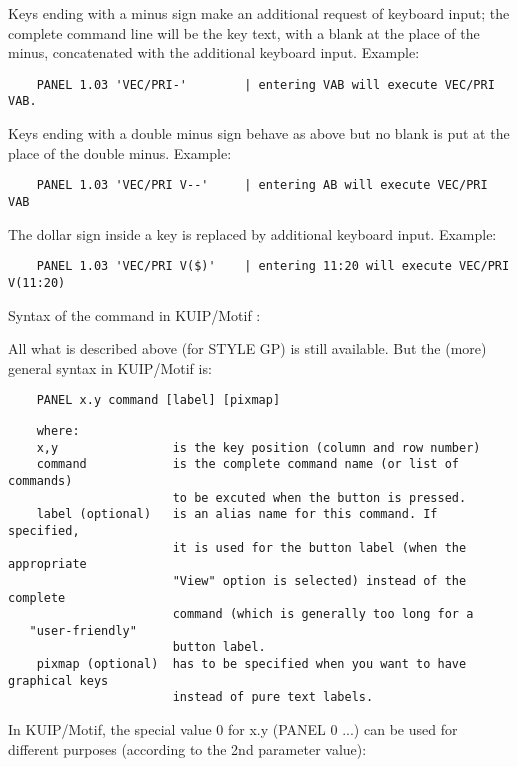    \par
Keys ending with a minus sign make an additional request of keyboard input; 
   the complete command line will be the key text, with a blank at the place 
   of the minus, concatenated with the additional keyboard input. Example:  
\begin{verbatim}
    PANEL 1.03 'VEC/PRI-'        | entering VAB will execute VEC/PRI VAB.
\end{verbatim}
   \par
Keys ending with a double minus sign behave as above but no blank is put at 
   the place of the double minus. Example:  
\begin{verbatim}
    PANEL 1.03 'VEC/PRI V--'     | entering AB will execute VEC/PRI VAB
\end{verbatim}
   \par
The dollar sign inside a key is replaced by additional keyboard input. 
   Example:  
\begin{verbatim}
    PANEL 1.03 'VEC/PRI V($)'    | entering 11:20 will execute VEC/PRI V(11:20)
\end{verbatim}
\ENDVERB
   \par
Syntax of the command in \DQUOTE{}KUIP/Motif\DQUOTE{} :  

   \par
All what is described above (for \DQUOTE{}STYLE GP\DQUOTE{}) is still 
   available.  But the (more) general syntax in \DQUOTE{}KUIP/Motif\DQUOTE{} 
   is:  

\begin{verbatim}
    PANEL x.y command [label] [pixmap]
\end{verbatim}
\begin{verbatim}
    where:
    x,y                is the key position (column and row number)
    command            is the complete command name (or list of commands)
                       to be excuted when the button is pressed.
    label (optional)   is an alias name for this command. If specified,
                       it is used for the button label (when the appropriate
                       "View" option is selected) instead of the complete
                       command (which is generally too long for a 
   "user-friendly"
                       button label.
    pixmap (optional)  has to be specified when you want to have graphical keys
                       instead of pure text labels.
\end{verbatim}
\ENDVERB
   \par
In KUIP/Motif, the special value \DQUOTE{}0\DQUOTE{} for x.y (PANEL  0 ...) 
   can be used for different purposes (according to the 2nd parameter value):  

